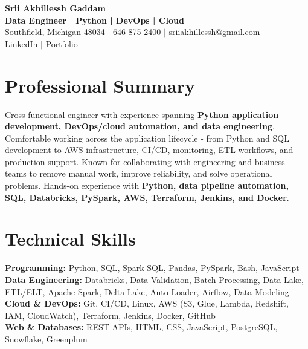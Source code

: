 \documentclass[letterpaper,10pt]{article}
\begin{document}
\fontsize{9.35pt}{10.45pt}\selectfont

\begin{center}
    {\LARGE \textbf{Srii Akhillessh Gaddam}} \\[-1pt]
    \textbf{Data Engineer | Python | DevOps | Cloud} \\[2pt]
    Southfield, Michigan 48034 $|$
    \href{tel:6468752400}{646-875-2400} $|$
    \href{mailto:sriiakhillessh@gmail.com}{sriiakhillessh@gmail.com} \\[1pt]
    \href{https://www.linkedin.com/in/srii-akhiilessh-gaddam-b48668191/}{LinkedIn} $|$
    \href{https://sriiakhillesshg.github.io/portfolio/}{Portfolio}
\end{center}
\vspace{-8pt}

\section{Professional Summary}
\small{Cross-functional engineer with experience spanning \textbf{Python application development, DevOps/cloud automation, and data engineering}. Comfortable working across the application lifecycle - from Python and SQL development to AWS infrastructure, CI/CD, monitoring, ETL workflows, and production support. Known for collaborating with engineering and business teams to remove manual work, improve reliability, and solve operational problems. Hands-on experience with \textbf{Python, data pipeline automation, SQL, Databricks, PySpark, AWS, Terraform, Jenkins, and Docker}.}

\section{Technical Skills}
\small{
\textbf{Programming:} Python, SQL, Spark SQL, Pandas, PySpark, Bash, JavaScript \\
\textbf{Data Engineering:} Databricks, Data Validation, Batch Processing, Data Lake, ETL/ELT, Apache Spark, Delta Lake, Auto Loader, Airflow, Data Modeling \\
\textbf{Cloud \& DevOps:} Git, CI/CD, Linux, AWS (S3, Glue, Lambda, Redshift, IAM, CloudWatch), Terraform, Jenkins, Docker, GitHub \\
\textbf{Web \& Databases:} REST APIs, HTML, CSS, JavaScript, PostgreSQL, Snowflake, Greenplum
}
\end{document}

